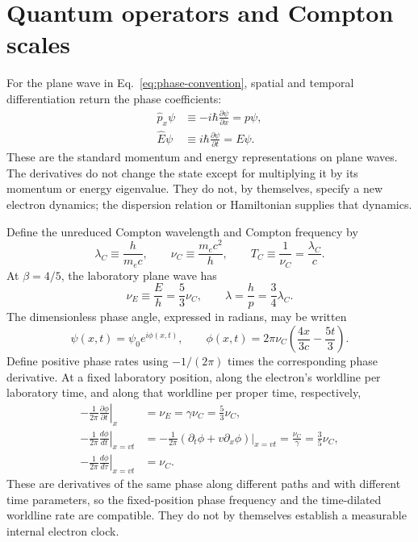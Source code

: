 \documentclass[12pt]{article}
\begin{document}
\section{Quantum operators and Compton scales}

For the plane wave in Eq.~\eqref{eq:phase-convention}, spatial and temporal differentiation return the phase coefficients:
\begin{align}
  \hat p_x\psi
  &\equiv-i\hbar\frac{\partial\psi}{\partial x}
   =p\psi,
  \label{eq:momentum-eigenvalue}\\
  \hat E\psi
  &\equiv i\hbar\frac{\partial\psi}{\partial t}
   =E\psi.
  \label{eq:energy-eigenvalue}
\end{align}
These are the standard momentum and energy representations on plane waves. The derivatives do not change the state except for multiplying it by its momentum or energy eigenvalue. They do not, by themselves, specify a new electron dynamics; the dispersion relation or Hamiltonian supplies that dynamics.

Define the unreduced Compton wavelength and Compton frequency by
\begin{equation}
  \lambda_C\equiv\frac{h}{m_ec},
  \qquad
  \nu_C\equiv\frac{m_ec^2}{h},
  \qquad
  T_C\equiv\frac{1}{\nu_C}=\frac{\lambda_C}{c}.
  \label{eq:compton-definitions}
\end{equation}
At $\beta=4/5$, the laboratory plane wave has
\begin{equation}
  \nu_E\equiv\frac{E}{h}=\frac{5}{3}\nu_C,
  \qquad
  \lambda=\frac{h}{p}=\frac{3}{4}\lambda_C.
  \label{eq:lab-compton-scales}
\end{equation}
The dimensionless phase angle, expressed in radians, may be written
\begin{equation}
  \psi(x,t)=\psi_0e^{i\phi(x,t)},
  \qquad
  \phi(x,t)=2\pi\nu_C\left(\frac{4x}{3c}-\frac{5t}{3}\right).
  \label{eq:phase-angle}
\end{equation}
Define positive phase rates using $-1/(2\pi)$ times the corresponding phase derivative. At a fixed laboratory position, along the electron's worldline per laboratory time, and along that worldline per proper time, respectively,
\begin{align}
  -\frac{1}{2\pi}\left.\frac{\partial\phi}{\partial t}\right|_x
  &=\nu_E=\gamma\nu_C=\frac{5}{3}\nu_C,
  \label{eq:phase-rate-fixed}\\
  -\frac{1}{2\pi}\left.\frac{d\phi}{dt}\right|_{x=vt}
  &=-\frac{1}{2\pi}\left.\left(\partial_t\phi+v\partial_x\phi\right)\right|_{x=vt}
   =\frac{\nu_C}{\gamma}=\frac{3}{5}\nu_C,
  \label{eq:phase-rate-worldline-lab}\\
  -\frac{1}{2\pi}\left.\frac{d\phi}{d\tau}\right|_{x=vt}
  &=\nu_C.
  \label{eq:phase-rate-worldline-proper}
\end{align}
These are derivatives of the same phase along different paths and with different time parameters, so the fixed-position phase frequency and the time-dilated worldline rate are compatible. They do not by themselves establish a measurable internal electron clock.
\end{document}
